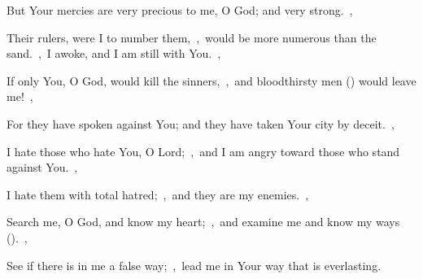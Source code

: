 \documentclass[12pt,twoside,a5paper]{article}
\begin{document}
\begin{normalparskip}
  But Your mercies are very precious to me, O God; and very strong.~\sep

  Their rulers, were I to number them,~\sep\ would be more numerous than the sand.~\sep\ I awoke, and I am still with You.~\sep

  If only You, O God, would kill the sinners,~\sep\ and bloodthirsty men () would leave me!~\sep

  For they have spoken against You; and they have taken Your city by deceit.~\sep

  I hate those who hate You, O Lord;~\sep\ and I am angry toward those who stand against You.~\sep

  I hate them with total hatred;~\sep\ and they are my enemies.~\sep

  Search me, O God, and know my heart;~\sep\ and examine me and know my ways ().~\sep

  See if there is in me a false way;~\sep\ lead me in Your way that is everlasting.
\end{normalparskip}

\end{document}
